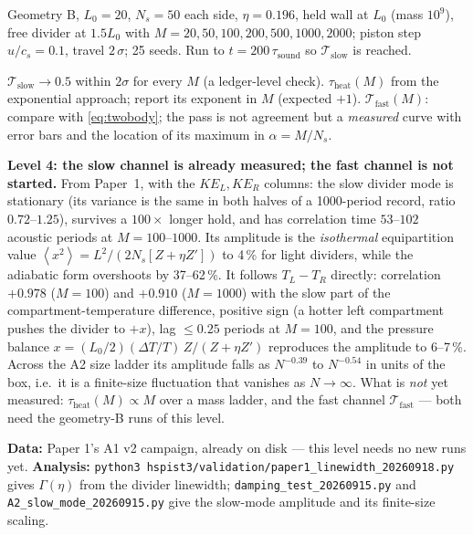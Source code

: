 \documentclass[11pt,a4paper]{article}
\newcommand{\avg}[1]{\left\langle #1 \right\rangle}
\newcommand{\ie}{i.e.\ }
\newcommand{\cmd}[1]{\texttt{\footnotesize #1}}
\begin{document}
\begin{run}
Geometry B, $L_0 = 20$, $N_s = 50$ each side, $\eta = 0.196$, held wall at $L_0$ (mass $10^9$), free divider at $1.5L_0$ with $M = 20, 50, 100, 200, 500, 1000, 2000$; piston step $u/c_s = 0.1$, travel $2\,\sigma$; 25 seeds. Run to $t = 200\,\tau_{\mathrm{sound}}$ so $\mathcal T_{\mathrm{slow}}$ is reached.
\end{run}
\begin{pass}
$\mathcal T_{\mathrm{slow}} \to 0.5$ within $2\sigma$ for every $M$ (a ledger-level check). $\tau_{\mathrm{heat}}(M)$ from the exponential approach; report its exponent in $M$ (expected $+1$). $\mathcal T_{\mathrm{fast}}(M)$: compare with \eqref{eq:twobody}; the pass is not agreement but a \emph{measured} curve with error bars and the location of its maximum in $\alpha = M/N_s$.
\end{pass}
\begin{res}
\textbf{Level 4: the slow channel is already measured; the fast channel is not started.}
From Paper~1, with the $KE_L, KE_R$ columns: the slow divider mode is stationary (its variance is the same in both halves of a 1000-period record, ratio $0.72$--$1.25$), survives a $100\times$ longer hold, and has correlation time $53$--$102$ acoustic periods at $M = 100$--$1000$. Its amplitude is the \emph{isothermal} equipartition value $\avg{x^2} = L^2/(2N_s[Z+\eta Z'])$ to 4\,\% for light dividers, while the adiabatic form overshoots by 37--62\,\%. It follows $T_L - T_R$ directly: correlation $+0.978$ ($M = 100$) and $+0.910$ ($M = 1000$) with the slow part of the compartment-temperature difference, positive sign (a hotter left compartment pushes the divider to $+x$), lag $\le 0.25$ periods at $M = 100$, and the pressure balance $x = (L_0/2)(\Delta T/T)\,Z/(Z+\eta Z')$ reproduces the amplitude to 6--7\,\%. Across the A2 size ladder its amplitude falls as $N^{-0.39}$ to $N^{-0.54}$ in units of the box, \ie it is a finite-size fluctuation that vanishes as $N\to\infty$. What is \emph{not} yet measured: $\tau_{\mathrm{heat}}(M)\propto M$ over a mass ladder, and the fast channel $\mathcal T_{\mathrm{fast}}$ --- both need the geometry-B runs of this level.
\end{res}

\begin{howto}
\textbf{Data:} Paper 1's A1 v2 campaign, already on disk --- this level needs no new runs yet.
\textbf{Analysis:} \cmd{python3 hspist3/validation/paper1\_linewidth\_20260918.py} gives $\Gamma(\eta)$ from the
divider linewidth; \cmd{damping\_test\_20260915.py} and \cmd{A2\_slow\_mode\_20260915.py} give the slow-mode
amplitude and its finite-size scaling.
\end{howto}
\end{document}
